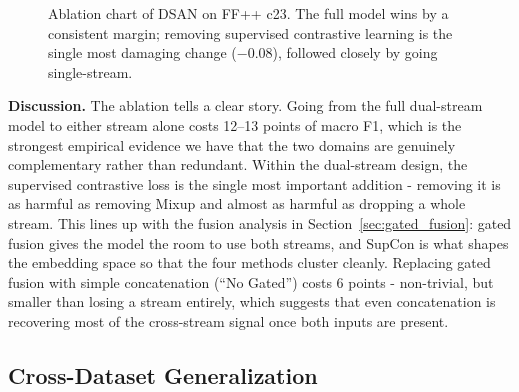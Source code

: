 \begin{figure}[!t]
\centering
{}
\caption{Ablation chart of DSAN on FF++ c23. The full model wins by a consistent margin; removing supervised contrastive learning is the single most damaging change ($-0.08$), followed closely by going single-stream.}
\label{fig:ablation_chart}
\end{figure}

\textbf{Discussion.}  The ablation tells a clear story. Going from the full dual-stream model to either stream alone costs 12--13 points of macro F1, which is the strongest empirical evidence we have that the two domains are genuinely complementary rather than redundant. Within the dual-stream design, the supervised contrastive loss is the single most important addition - removing it is as harmful as removing Mixup and almost as harmful as dropping a whole stream. This lines up with the fusion analysis in Section~\ref{sec:gated_fusion}: gated fusion gives the model the room to use both streams, and SupCon is what shapes the embedding space so that the four methods cluster cleanly. Replacing gated fusion with simple concatenation (``No Gated'') costs 6 points - non-trivial, but smaller than losing a stream entirely, which suggests that even concatenation is recovering most of the cross-stream signal once both inputs are present.

\subsection{Cross-Dataset Generalization}
\label{sec:cross_dataset}

